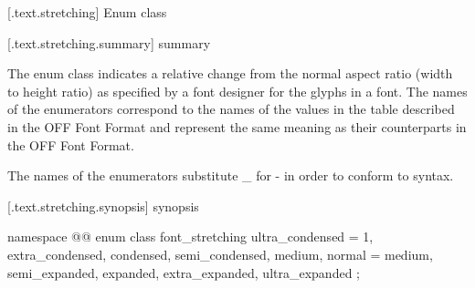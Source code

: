 
 [\iotwod.text.stretching] {Enum class }

 [\iotwod.text.stretching.summary] { summary}

\pnum
The  enum class indicates a relative change from the normal aspect ratio (width to height ratio) as specified by a
font designer for the glyphs in a font. The names of the enumerators correspond to the names of the  values in the  table described in the OFF Font Format and represent the same meaning as their counterparts in the OFF Font Format.

\pnum
The names of the enumerators substitute _ for - in order to conform to \Cpp{} syntax.

 [\iotwod.text.stretching.synopsis] { synopsis}

\begin{codeblock}
namespace @\fullnamespace{}@ {
  enum class font_stretching {
    ultra_condensed = 1,
    extra_condensed,
    condensed,
    semi_condensed,
    medium,
    normal = medium,
    semi_expanded,
    expanded,
    extra_expanded,
    ultra_expanded
  };
}
\end{codeblock}
